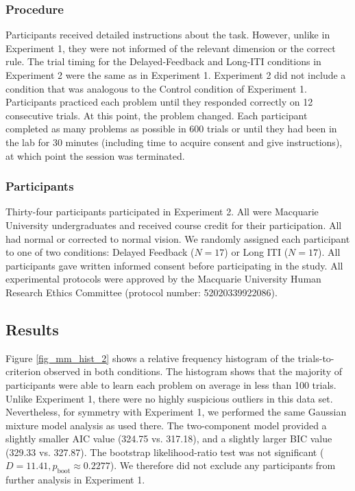 \documentclass[doc, floatsintext]{apa7}
\begin{document}
\subsubsection{Procedure}
Participants received detailed instructions about the task.
However, unlike in Experiment 1, they were not informed of
the relevant dimension or the correct rule. The trial timing
for the Delayed-Feedback and Long-ITI conditions in
Experiment 2 were the same as in Experiment 1. Experiment 2
did not include a condition that was analogous to the
Control condition of Experiment 1. Participants practiced
each problem until they responded correctly on 12
consecutive trials. At this point, the problem changed. Each
participant completed as many problems as possible in 600
trials or until they had been in the lab for 30 minutes
(including time to acquire consent and give instructions),
at which point the session was terminated.

\subsubsection{Participants}
Thirty-four participants participated in Experiment 2. All
were Macquarie University undergraduates and received course
credit for their participation. All had normal or corrected
to normal vision. We randomly assigned each participant to
one of two conditions: Delayed Feedback ($N = 17$) or Long
ITI ($N = 17$).  All participants gave written informed
consent before participating in the study. All experimental
protocols were approved by the Macquarie University Human
Research Ethics Committee (protocol number: 52020339922086). 

\subsection{Results}
Figure \ref{fig_mm_hist_2} shows a relative frequency
histogram of the trials-to-criterion observed in both
conditions. The histogram shows that the majority of
participants were able to learn each problem on average in
less than 100 trials.  Unlike Experiment 1, there were no
highly suspicious outliers in this data set. Nevertheless,
for symmetry with Experiment 1, we performed the same
Gaussian mixture model analysis as used there. The
two-component model provided a slightly smaller AIC value
(324.75 vs. 317.18), and a slightly larger BIC value (329.33
vs. 327.87). The bootstrap likelihood-ratio test was not
significant ($D = 11.41, p_{\text{boot}} \approx 0.2277$).
We therefore did not exclude any participants from further
analysis in Experiment 1.
\end{document}
